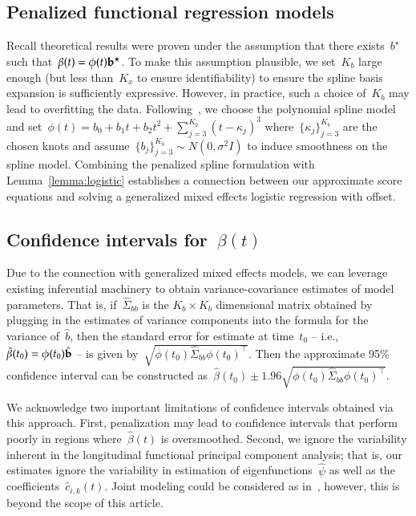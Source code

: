 \documentclass[12pt]{amsart}
\begin{document}
\subsection{Penalized functional regression models}

Recall theoretical results were proven under the assumption that there exists~$b^\star$ such that~$\beta(t) = \phi(t) {\bf b}^\star$. To make this assumption plausible, we set~$K_b$ large enough (but less than~$K_x$ to ensure identifiability) to ensure the spline basis expansion is sufficiently expressive. However, in practice, such a choice of~$K_b$ may lead to overfitting the data. Following~\cite{Goldsmith2011}, we choose the polynomial spline model and set~$\phi(t) = b_0 + b_1 t + b_2 t^2 + \sum_{j=3}^{K_b} (t-\kappa_j)^3$ where~$\{ \kappa_j \}_{j=3}^{K_b}$ are the chosen knots and assume~$\{ b_j \}_{j=3}^{K_b} \sim N(0, \sigma^2 I)$ to induce smoothness on the spline model.  Combining the penalized spline formulation with Lemma~\ref{lemma:logistic} establishes a connection between our approximate score equations and solving a generalized mixed effects logistic regression with offset.

\subsection{Confidence intervals for~$\beta(t)$}

Due to the connection with generalized mixed effects models, we can leverage existing inferential machinery to obtain variance-covariance estimates of model parameters. That is, if~$\hat \Sigma_{bb}$ is the $K_b \times K_b$ dimensional matrix obtained by plugging in the estimates of variance components into the formula for the variance of~$\hat b$, then the standard error for estimate at time~$t_0$ -- i.e., ~$\hat \beta (t_0) = \phi(t_0) \hat {\bf b}$ -- is given by~$\sqrt{ \phi (t_0 ) \hat \Sigma_{bb} \phi(t_0)^\top}$.  Then the approximate 95\% confidence interval can be constructed as~$\hat \beta (t_0) \pm 1.96 \sqrt{\phi (t_0) \hat \Sigma_{bb} \phi(t_0)^\top}$.

We acknowledge two important limitations of confidence intervals obtained via this approach. First, penalization may lead to confidence intervals that perform poorly in regions where~$\hat \beta(t)$ is oversmoothed. Second, we ignore the variability inherent in the longitudinal functional principal component analysis; that is, our estimates ignore the variability in estimation of eigenfunctions~$\hat \psi$ as well as the coefficients~$\hat c_{i,k}(t)$. Joint modeling could be considered as in~\cite{Crainiceanu2010}, however, this is beyond the scope of this article.
\end{document}
